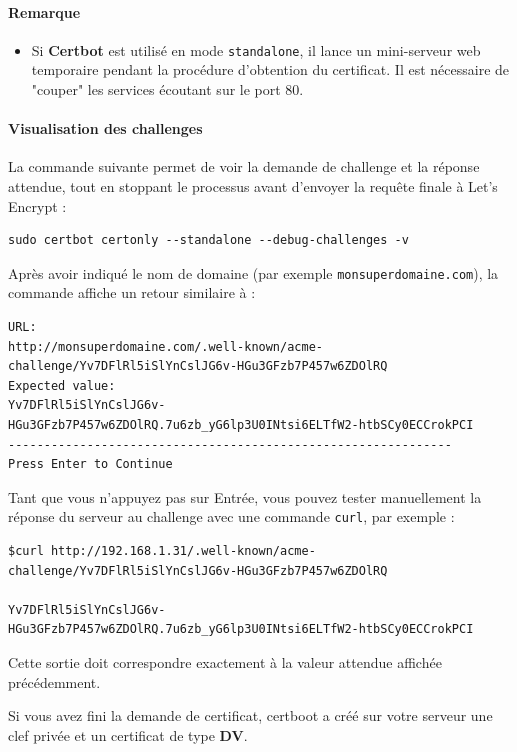 \documentclass[french, 12pt]{article}%
\newcommand{\itemE}{\item[$\bullet$]}
\begin{document}
\paragraph{Remarque}
\begin{itemize}
  \itemE Si \textbf{Certbot} est utilisé en mode \texttt{standalone}, il lance un mini-serveur web temporaire pendant la procédure d’obtention du certificat.  
Il est nécessaire de "couper" les services écoutant sur le port 80.
\end{itemize}

\paragraph{Visualisation des challenges}

La commande suivante permet de voir la demande de challenge et la réponse attendue, tout en stoppant le processus avant d’envoyer la requête finale à Let's Encrypt :

\begin{lstlisting}[style=commande]
sudo certbot certonly --standalone --debug-challenges -v
\end{lstlisting}

Après avoir indiqué le nom de domaine (par exemple \verb?monsuperdomaine.com?), la commande affiche un retour similaire à : 

\begin{lstlisting}[style=commande]
URL:
http://monsuperdomaine.com/.well-known/acme-challenge/Yv7DFlRl5iSlYnCslJG6v-HGu3GFzb7P457w6ZDOlRQ
Expected value:
Yv7DFlRl5iSlYnCslJG6v-HGu3GFzb7P457w6ZDOlRQ.7u6zb_yG6lp3U0INtsi6ELTfW2-htbSCy0ECCrokPCI
--------------------------------------------------------------
Press Enter to Continue
\end{lstlisting}

Tant que vous n’appuyez pas sur Entrée, vous pouvez tester manuellement la réponse du serveur au challenge avec une commande \texttt{curl}, par exemple :

\begin{lstlisting}[style=commande]
$curl http://192.168.1.31/.well-known/acme-challenge/Yv7DFlRl5iSlYnCslJG6v-HGu3GFzb7P457w6ZDOlRQ

Yv7DFlRl5iSlYnCslJG6v-HGu3GFzb7P457w6ZDOlRQ.7u6zb_yG6lp3U0INtsi6ELTfW2-htbSCy0ECCrokPCI
\end{lstlisting}

Cette sortie doit correspondre exactement à la valeur attendue affichée précédemment.


\vspace{0.5cm}
Si vous avez fini la demande de certificat, certboot a créé sur votre serveur une clef privée et un certificat de type \textbf{DV}.
\end{document}
